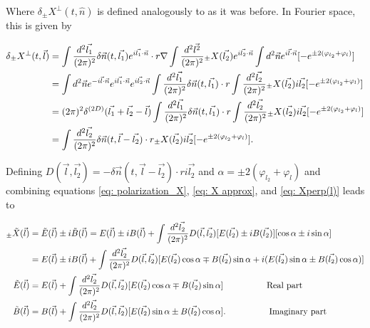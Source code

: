 \documentclass{article}
\begin{document}
Where $\delta{}_{\pm}X^\perp(t, \hat{n})$ is defined analogously to as it was before. In Fourier space, this is given by 

\begin{align}
    \delta{}_{\pm}X^\perp(t, \vec{l})  &= \int\frac{d^2\vec{l_1}}{(2\pi)^2}\delta \vec{n}(t, \vec{l_1})e^{i\vec{l_1}\cdot \vec{n}}\cdot r\nabla\int\frac{d^2\vec{l^2}}{(2\pi)^2} {}_{\pm}X(\vec{l_2})e^{i\vec{l_2}\cdot \vec{n}}\int d^2\vec{n}e^{i\vec{l}\cdot \vec{n}}[-e^{\pm 2(\varphi_{l_2}+\varphi_l)}] \notag \\
    &= \int d^2\vec{n} e^{-i\vec{l}\cdot\vec{n}}e^{i\vec{l_1}\cdot\vec{n}}e^{i\vec{l_2}\cdot\vec{n}}\int\frac{d^2\vec{l_1}}{(2\pi)^2}\delta\vec{n}(t,\vec{l_1}) \cdot r\int\frac{d^2\vec{l_2}}{(2\pi)^2}{}_{\pm}X(\vec{l_2})i\vec{l_2}[-e^{\pm 2(\varphi_{l_2}+\varphi_l)}] \notag \\
    &= (2\pi)^2\delta^{(2D)}(\vec{l_1}+\vec{l_2}-\vec{l})\int\frac{d^2\vec{l_1}}{(2\pi)^2}\delta\vec{n}(t,\vec{l_1})\cdot r\int\frac{d^2\vec{l_2}}{(2\pi)^2}{}_{\pm}X(\vec{l_2})i\vec{l_2}[-e^{\pm 2(\varphi_{l_2}+\varphi_l)}] \notag \\
    &= \int\frac{d^2\vec{l_2}}{(2\pi)^2}\delta\vec{n}(t,\vec{l}-\vec{l_2})\cdot r{}_\pm X(\vec{l_2})i\vec{l_2}[-e^{\pm 2(\varphi_{l_2}+\varphi_l)}]. \label{eq: Xperp(l)}
\end{align}



Defining $D(\vec{l}, \vec{l_2}) = -\delta\vec{n}(t,\vec{l}-\vec{l_2})\cdot ri\vec{l_2}$ and $\alpha = \pm 2(\varphi_{l_2}+\varphi_l)$ and combining equations \ref{eq: polarization_X}, \ref{eq: X approx}, and \ref{eq: Xperp(l)} leads to

\begin{align}
    {}_{\pm}\Tilde{X}(\vec{l}) &= \Tilde{E}(\vec{l}) \pm i\Tilde{B}(\vec{l}) \notag = E(\vec{l}) \pm  iB(\vec{l}) + \int\frac{d^2\vec{l_2}}{(2\pi)^2}D(\vec{l}, \vec{l_2})[E(\vec{l_2}) \pm  iB(\vec{l_2})][\cos{\alpha} \pm i\sin\alpha] \notag \\ 
    &= E(\vec{l}) \pm  iB(\vec{l}) + \int\frac{d^2\vec{l_2}}{(2\pi)^2}D(\vec{l}, \vec{l_2})[E(\vec{l_2})\cos\alpha \mp B(\vec{l_2})\sin\alpha + i(E(\vec{l_2})\sin\alpha \pm B(\vec{l_2})\cos\alpha)] \notag \\
    \Tilde{E}(\vec{l}) &= {E}(\vec{l}) + \int\frac{d^2\vec{l_2}}{(2\pi)^2}D(\vec{l}, \vec{l_2})[E(\vec{l_2})\cos\alpha \mp B(\vec{l_2})\sin\alpha] \hspace{50pt} \text{Real part}\\
    \Tilde{B}(\vec{l}) &= {B}(\vec{l}) + \int\frac{d^2\vec{l_2}}{(2\pi)^2}D(\vec{l}, \vec{l_2})[E(\vec{l_2})\sin\alpha \pm B(\vec{l_2})\cos\alpha]. \hspace{50pt}\text{Imaginary part}
\end{align}
\end{document}
